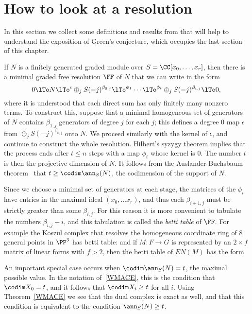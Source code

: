 \section{How to look at a resolution}
In this section we collect some definitions and results from \cite{Eisenbud1995} that will help to understand the exposition of Green's conjecture, which occupies the last section of this chapter.

If $N$ is a finitely generated graded module over $S = \CC[x_0,\dots, x_r]$, then there is a minimal graded free resolution $\FF$
of $N$ that we can write in the form
$$
0\lTo N \lTo^\epsilon \oplus_jS(-j)^{\beta_{0,j}} \lTo^{\phi_1} \cdots \lTo^{\phi_t}\oplus_jS(-j)^{\beta_{t,j}}\lTo 0,
$$
where it is understood that each direct sum has only finitely many nonzero terms.
To construct this, suppose that a minimal homogeneous set of generators of $N$
contains $\beta_{1,j}$ generators of degree $j$ for each $j$; this defines a degree 0 map $\epsilon$
from 
$
\oplus_jS(-j)^{\beta_{0,j}}
$
onto $N$. We proceed similarly with the kernel of $\epsilon$, and continue to construct the whole resolution.
Hilbert's syzygy theorem \cite[***]{Eisenbud1995} implies that the process ends after $t\leq n$ steps with a map $\phi_t$ whose
kernel is 0. The number $t$ is then the projective dimension of $N$. It follows from the Auslander-Buchsbaum
theorem~\cite[***]{Eisenbud1995} that $t \geq \codim \ann_S(N)$, the codimension of the support of $N$.

Since we choose a minimal set of generators at each stage, the matrices of the $\phi_i$ have entries in the maximal
ideal $(x_0,\dots x_r)$, and thus each $\beta_{i+1, j}$ must be strictly greater than some $\beta_{i,j}$. For this reason it
is more convenient to tabulate the numbers $\beta_{i,j}-i$, and this tabulation is called the \emph{betti table} of $\FF$.
For example the Koszul complex that resolves the homogeneous coordinate ring of 8 general points in $\PP^3$ has
betti table: 
and if $M:F\to G$ is represented by an $2\times f$ matrix of linear forms with $f>2$, then  the betti table of $EN(M)$
has the form

An important special case occurs when  $\codim \ann_S(N) = t$, the maximal possible value. In the notation of~\ref{WMACE}, this is the condition that $\codim X_0 = t$, and it follows that $\codim X_i \geq t$
for all $i$. Using Theorem~\ref{WMACE} we see that the dual complex is exact as well, and that this condition
is equivalent to the condition $\ann_S(N) \geq t$.


